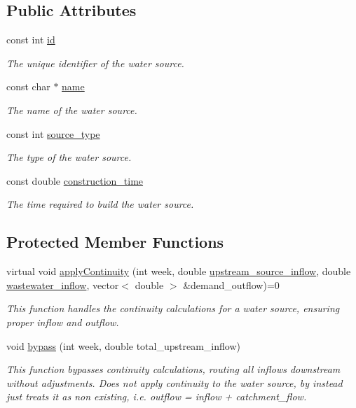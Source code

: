 \subsection*{Public Attributes}
\begin{DoxyCompactItemize}
\item 
const int \mbox{\hyperlink{classWaterSource_a6eafe5dfefd317877d1244e8a7c6e742}{id}}
\begin{DoxyCompactList}\small\item\em The unique identifier of the water source. \end{DoxyCompactList}\item 
const char $\ast$ \mbox{\hyperlink{classWaterSource_a846ea74c5b453d014f594d41fee8c765}{name}}
\begin{DoxyCompactList}\small\item\em The name of the water source. \end{DoxyCompactList}\item 
const int \mbox{\hyperlink{classWaterSource_afdd12c29fc74ea21dff1f1be9b8c2b7b}{source\+\_\+type}}
\begin{DoxyCompactList}\small\item\em The type of the water source. \end{DoxyCompactList}\item 
const double \mbox{\hyperlink{classWaterSource_ae059fbe3f911a819bac0202f7f45e8e4}{construction\+\_\+time}}
\begin{DoxyCompactList}\small\item\em The time required to build the water source. \end{DoxyCompactList}\end{DoxyCompactItemize}
\subsection*{Protected Member Functions}
\begin{DoxyCompactItemize}
\item 
virtual void \mbox{\hyperlink{classWaterSource_ac070445379fe706f65b977dade4f3fbc}{apply\+Continuity}} (int week, double \mbox{\hyperlink{classWaterSource_a7a69b2e9b6030f1035e6cf44d2918ee5}{upstream\+\_\+source\+\_\+inflow}}, double \mbox{\hyperlink{classWaterSource_aeb5a2d2d83383a70ca20f3e94635a9c7}{wastewater\+\_\+inflow}}, vector$<$ double $>$ \&demand\+\_\+outflow)=0
\begin{DoxyCompactList}\small\item\em This function handles the continuity calculations for a water source, ensuring proper inflow and outflow. \end{DoxyCompactList}\item 
void \mbox{\hyperlink{classWaterSource_abeb8ba4b51c2b270baf9162df76d8b58}{bypass}} (int week, double total\+\_\+upstream\+\_\+inflow)
\begin{DoxyCompactList}\small\item\em This function bypasses continuity calculations, routing all inflows downstream without adjustments. Does not apply continuity to the water source, by instead just treats it as non existing, i.\+e. outflow = inflow + catchment\+\_\+flow. \end{DoxyCompactList}\end{DoxyCompactItemize}
